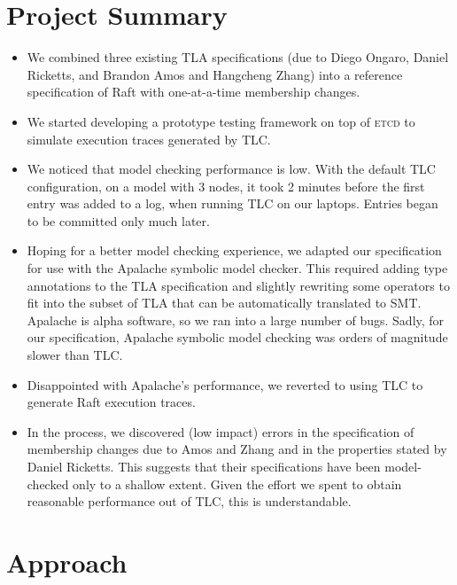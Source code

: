 \documentclass[a4paper]{article}
\newcommand{\tname}[1]{\textsc{#1}\xspace}
\newcommand{\etcd}{\tname{etcd}}
\begin{document}
\section{Project Summary}

\begin{itemize}
    \item We combined three existing TLA specifications (due to Diego Ongaro, Daniel Ricketts, and Brandon Amos and Hangcheng Zhang) into a reference specification of Raft with one-at-a-time membership changes.

    \item We started developing a prototype testing framework on top of \etcd to simulate execution traces generated by TLC.

    \item We noticed that model checking performance is low.
    With the default TLC configuration, on a model with 3 nodes, it took 2 minutes before the first entry was added to a log, when running TLC on our laptops.
    Entries began to be committed only much later.

    \item Hoping for a better model checking experience, we adapted our specification for use with the Apalache symbolic model checker.
    This required adding type annotations to the TLA specification and slightly rewriting some operators to fit into the subset of TLA that can be automatically translated to SMT.
    Apalache is alpha software, so we ran into a large number of bugs.
    Sadly, for our specification, Apalache symbolic model checking was orders of magnitude slower than TLC.

    \item Disappointed with Apalache's performance, we reverted to using TLC to generate Raft execution traces.

    \item In the process, we discovered (low impact) errors in the
    specification of membership changes due to Amos and Zhang and in the
    properties stated by Daniel Ricketts.
    This suggests that their specifications have been model-checked only to a shallow extent.
    Given the effort we spent to obtain reasonable performance out of TLC, this is understandable.

\end{itemize}


\section{Approach}
\end{document}
